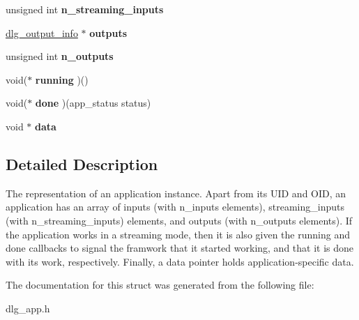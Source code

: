 \begin{DoxyCompactItemize}
\item 
\mbox{\label{struct__dlg__app__info_a48c5706ab177d9bd3c55ec4f7a08b5d5}} 
unsigned int {\bfseries n\+\_\+streaming\+\_\+inputs}
\item 
\mbox{\label{struct__dlg__app__info_a8e1375a18abd9d7a3abc7d57bdd28d28}} 
\mbox{\hyperlink{struct__dlg__output__info}{dlg\+\_\+output\+\_\+info}} $\ast$ {\bfseries outputs}
\item 
\mbox{\label{struct__dlg__app__info_a01516453589f0ee89c7be67c47e30d4a}} 
unsigned int {\bfseries n\+\_\+outputs}
\item 
\mbox{\label{struct__dlg__app__info_ab2c48de1eaa4dec4f1766176d5222c67}} 
void($\ast$ {\bfseries running} )()
\item 
\mbox{\label{struct__dlg__app__info_a84fac302770783dd3322aef0ab9c8bc5}} 
void($\ast$ {\bfseries done} )(app\+\_\+status status)
\item 
\mbox{\label{struct__dlg__app__info_a8fad78e28731125ffdc6ccbbe1cb2eb6}} 
void $\ast$ {\bfseries data}
\end{DoxyCompactItemize}


\subsection{Detailed Description}
The representation of an application instance. Apart from its U\+ID and O\+ID, an application has an array of inputs (with n\+\_\+inputs elements), streaming\+\_\+inputs (with n\+\_\+streaming\+\_\+inputs) elements, and outputs (with n\+\_\+outputs elements). If the application works in a streaming mode, then it is also given the running and done callbacks to signal the framwork that it started working, and that it is done with its work, respectively. Finally, a data pointer holds application-\/specific data. 

The documentation for this struct was generated from the following file\+:\begin{DoxyCompactItemize}
\item 
dlg\+\_\+app.\+h\end{DoxyCompactItemize}
